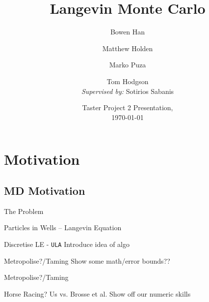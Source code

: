 \documentclass[aspectratio=169]{beamer}
\title{Langevin Monte Carlo}
\author{Bowen Han\inst{1} \and Matthew Holden\inst{1} \and Marko Puza\inst{1} \and Tom Hodgson\inst{1}\\ \textit{Supervised by:} Sotirios Sabanis\inst{2}}
\institute[Universities of Somewhere and Elsewhere] %
{
  \inst{1}%
    The Maxwell Institute Graduate School in Analysis \& its Applications
  \and
  \inst{2}%
  University of Edinburgh
}
\date{ Taster Project 2 Presentation,\\ \today}
\begin{document}
\begin{frame}
  \titlepage
\end{frame}


\section{Motivation}


\subsection{MD Motivation}

\begin{frame}{The Problem}
    
\end{frame}

\begin{frame}{Particles in Wells -- Langevin Equation}
    
\end{frame}

\begin{frame}{Discretise LE - \texttt{ULA}}
    Introduce idea of algo
\end{frame}
\begin{frame}{Metropolise?/Taming}
    Show some math/error bounds??
\end{frame}

\begin{frame}{Metropolise?/Taming}
    
\end{frame}

\begin{frame}{Horse Racing? Us vs. Brosse et al.}
    Show off our numeric skills
\end{frame}
\end{document}
